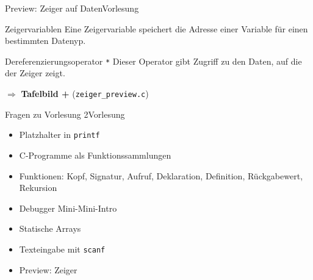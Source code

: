 \documentclass[xcolor=dvipsnames]{beamer}
\newcounter{lecturecounter}
\begin{document}
\begin{frame}[fragile]{Preview: Zeiger auf Daten}{Vorlesung }
\begin{block}{Zeigervariablen}
  Eine Zeigervariable speichert die Adresse einer Variable für einen bestimmten Datenyp.
\end{block}
\begin{block}{Dereferenzierungsoperator \texttt{*}}
  Dieser Operator gibt Zugriff zu den Daten, auf die der Zeiger zeigt.
\end{block}
$\Rightarrow$ \textbf{Tafelbild +} (\texttt{zeiger\_preview.c})
\end{frame}


\begin{frame}[fragile]{Fragen zu Vorlesung 2}{Vorlesung }
  \begin{itemize}
    \item{Platzhalter in \texttt{printf}}
    \item{C-Programme als Funktionssammlungen}
    \item{Funktionen: Kopf, Signatur, Aufruf, Deklaration, Definition, Rückgabewert, Rekursion}
    \item{Debugger Mini-Mini-Intro}
    \item{Statische Arrays}
    \item{Texteingabe mit \texttt{scanf}}
    \item{Preview: Zeiger}
  \end{itemize}
\end{frame}
\end{document}

